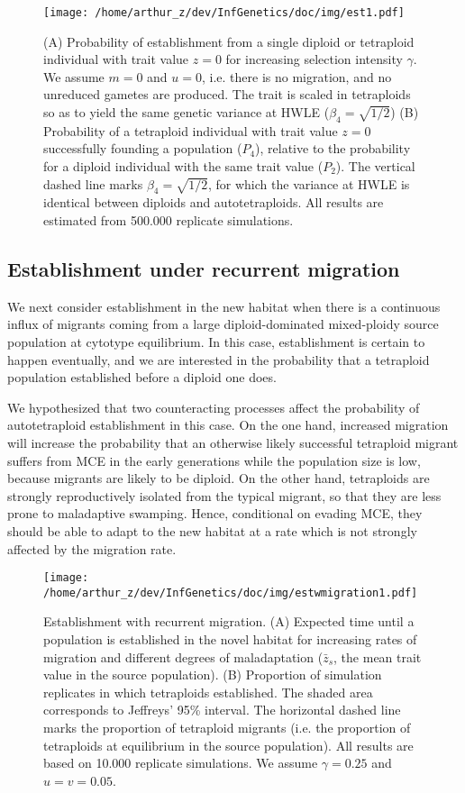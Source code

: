 \documentclass[11pt,a4paper]{article}
\begin{document}
\begin{figure}[t]
\centering
\texttt{[image: /home/arthur\_z/dev/InfGenetics/doc/img/est1.pdf]}
\caption{
(A) Probability of establishment from a single diploid or tetraploid individual
with trait value $z=0$ for increasing selection intensity $\gamma$.
We assume $m=0$ and $u=0$, i.e. there is no migration, and no unreduced
gametes are produced. The trait is scaled in tetraploids so as to yield the
same genetic variance at HWLE ($\beta_4 = \sqrt{1/2}$)
(B) Probability of a tetraploid individual with trait value $z = 0$
successfully founding a population ($P_4$), relative to the probability for a
diploid individual with the same trait value ($P_2$).
The vertical dashed line marks $\beta_4=\sqrt{1/2}$, for which the variance at
HWLE is identical between diploids and autotetraploids.
All results are estimated from 500.000 replicate simulations.
\label{fig:est1}}
\end{figure}


\subsection*{Establishment under recurrent migration}

We next consider establishment in the new habitat when there is a continuous
influx of migrants coming from a large diploid-dominated mixed-ploidy source
population at cytotype equilibrium.
In this case, establishment is certain to happen eventually, and we are
interested in the probability that a tetraploid population established before a
diploid one does.

We hypothesized that two counteracting processes affect the probability of
autotetraploid establishment in this case.
On the one hand, increased migration will increase the probability that an
otherwise likely successful tetraploid migrant suffers from MCE in the early
generations while the population size is low, because migrants are likely to be
diploid.
On the other hand, tetraploids are strongly reproductively isolated from
the typical migrant, so that they are less prone to maladaptive swamping.
Hence, conditional on evading MCE, they should be able to adapt to the new
habitat at a rate which is not strongly affected by the migration rate.

\begin{figure}[t]
\centering
\texttt{[image: /home/arthur\_z/dev/InfGenetics/doc/img/estwmigration1.pdf]}
\caption{
Establishment with recurrent migration.
(A) Expected time until a population is established in the novel habitat for
increasing rates of migration and different degrees of maladaptation
($\bar{z}_s$, the mean trait value in the source population). 
(B) Proportion of simulation replicates in which tetraploids established. 
The shaded area corresponds to Jeffreys' 95\% interval.
The horizontal dashed line marks the proportion of tetraploid migrants (i.e.
the proportion of tetraploids at equilibrium in the source population).
All results are based on 10.000 replicate simulations.
We assume $\gamma=0.25$ and $u=v=0.05$.
\label{fig:estwmig}}
\end{figure}
\end{document}
